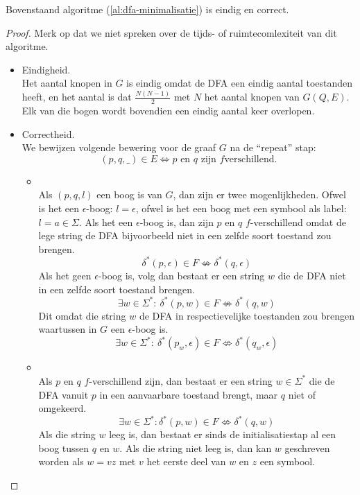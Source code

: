 \documentclass[main.tex]{subfiles}
\begin{document}
\begin{st}
  Bovenstaand algoritme (\ref{al:dfa-minimalisatie}) is eindig en correct.
  \begin{proof}
    Merk op dat we niet spreken over de tijds- of ruimtecomlexiteit van dit algoritme.
    \begin{itemize}
    \item Eindigheid.\\
    Het aantal knopen in $G$ is eindig omdat de DFA een eindig aantal toestanden heeft, en het aantal is dat $\frac{N(N-1)}{2}$ met $N$ het aantal knopen van $G(Q,E)$.
    Elk van die bogen wordt bovendien een eindig aantal keer overlopen.
    \item Correctheid.\\
      We bewijzen volgende bewering voor de graaf $G$ na de ``repeat'' stap:
      \[ (p,q,\_) \in E \Leftrightarrow p \text{ en } q \text { zijn } f\text{verschillend.}\]
      \begin{itemize}
      \item \framebox{$\Rightarrow$}\\
        Als $(p,q,l)$ een boog is van $G$, dan zijn er twee mogenlijkheden.
        Ofwel is het een $\epsilon$-boog: $l=\epsilon$, ofwel is het een boog met een symbool als label: $l = a \in \Sigma$.
        Als het een $\epsilon$-boog is, dan zijn $p$ en $q$ $f$-verschillend omdat de lege string de DFA bijvoorbeeld niet in een zelfde soort toestand zou brengen.
        \[ \delta^{*}(p,\epsilon) \in F \not\Leftrightarrow \delta^{*}(q,\epsilon) \]
        Als het geen $\epsilon$-boog is, volg dan bestaat er een string $w$ die de DFA niet in een zelfde soort toestand brengen.
        \[ \exists w\in \Sigma^{*}:\ \delta^{*}(p,w) \in F \not\Leftrightarrow \delta^{*}(q,w) \]
        Dit omdat die string $w$ de DFA in respectievelijke toestanden zou brengen waartussen in $G$ een $\epsilon$-boog is.
        \[ \exists w\in \Sigma^{*}:\  \delta^{*}(p_{w},\epsilon) \in F \not\Leftrightarrow \delta^{*}(q_{w},\epsilon) \]
      \item \framebox{$\Leftarrow$}\\
        Als $p$ en $q$ $f$-verschillend zijn, dan bestaat er een string $w\in \Sigma^{*}$ die de DFA vanuit $p$ in een aanvaarbare toestand brengt, maar $q$ niet of omgekeerd.
        \[ \exists w \in \Sigma^{*}: \delta^{*}(p,w) \in F \not\Leftrightarrow \delta^{*}(q,w) \]
        Als die string $w$ leeg is, dan bestaat er sinds de initialisatiestap al een boog tussen $q$ en $w$. Als die string niet leeg is, dan kan $w$ geschreven worden als $w = vz$ met $v$ het eerste deel van $w$ en $z$ een symbool.

\end{itemize}
\end{itemize}
\end{proof}
\end{st}
\end{document}
